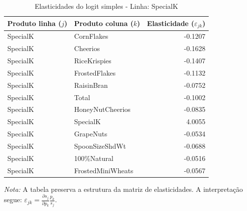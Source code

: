 \begingroup
\begin{table}[H]
\centering
\caption{Elasticidades do logit simples - Linha: SpecialK}
\label{tab:elas-specialk}
\small
\begin{tabular}{llr}
\toprule
Produto linha ($j$) & Produto coluna ($k$) & Elasticidade ($\varepsilon_{jk}$) \\
\midrule
SpecialK & CornFlakes & -0.1207 \\
SpecialK & Cheerios & -0.1628 \\
SpecialK & RiceKrispies & -0.1407 \\
SpecialK & FrostedFlakes & -0.1132 \\
SpecialK & RaisinBran & -0.0752 \\
SpecialK & Total & -0.1002 \\
SpecialK & HoneyNutCheerios & -0.0835 \\
SpecialK & SpecialK & 4.0055 \\
SpecialK & GrapeNuts & -0.0534 \\
SpecialK & SpoonSizeShdWt & -0.0688 \\
SpecialK & 100\%Natural & -0.0516 \\
SpecialK & FrostedMiniWheats & -0.0567 \\
\bottomrule
\end{tabular}

\vspace{0.3em}
\footnotesize
\textit{Nota:} A tabela preserva a estrutura da matriz de elasticidades. A interpretação segue: $\varepsilon_{jk}=\frac{\partial s_j}{\partial p_k}\frac{p_k}{s_j}$.
\end{table}
\endgroup


